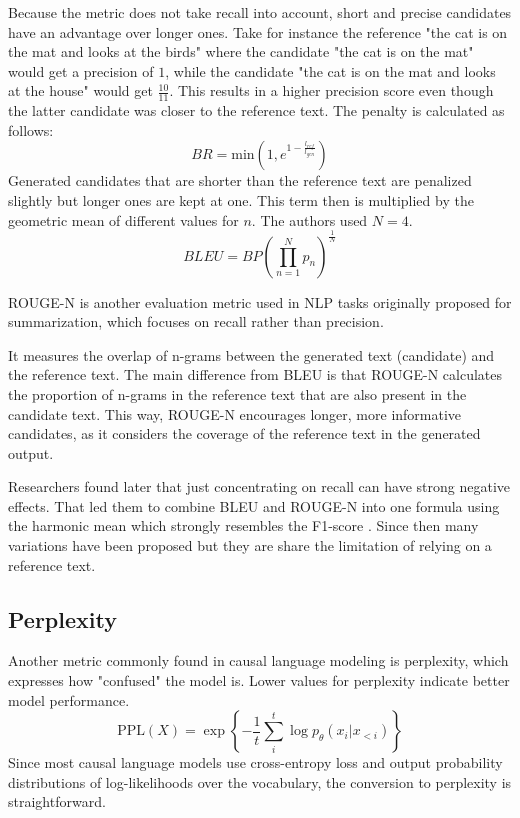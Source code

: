 Because the metric does not take recall into account, short and precise candidates have an advantage over longer ones. Take for instance the reference "the cat is on the mat and looks at the birds" where the candidate "the cat is on the mat" would get a precision of $1$, while the candidate "the cat is on the mat and looks at the house" would get $\frac{10}{11}$. This results in a higher precision score even though the latter candidate was closer to the reference text. The penalty is calculated as follows:
\begin{equation}
    BR = \text{min}(1, e^{1-\frac{l_{ref}}{l_{gen}}})
\end{equation}
Generated candidates that are shorter than the reference text are penalized slightly but longer ones are kept at one. This term then is multiplied by the geometric mean of different values for $n$. The authors used $N=4$.
\begin{equation}
    BLEU = BP \left(\prod_{n=1}^N p_n\right)^{\frac{1}{N}}
\end{equation}

ROUGE-N \cite{lin2004rouge} is another evaluation metric used in NLP tasks originally proposed for summarization, which focuses on recall rather than precision.

It measures the overlap of n-grams between the generated text (candidate) and the reference text. The main difference from BLEU is that ROUGE-N calculates the proportion of n-grams in the reference text that are also present in the candidate text. This way, ROUGE-N encourages longer, more informative candidates, as it considers the coverage of the reference text in the generated output.

Researchers found later that just concentrating on recall can have strong negative effects. That led them to combine BLEU and ROUGE-N into one formula using the harmonic mean which strongly resembles the F1-score \cite[p. 152]{tunstall2022transformers}. Since then many variations have been proposed but they are share the limitation of relying on a reference text.

\subsection{Perplexity} \label{sec:perplexity}
Another metric commonly found in causal language modeling is perplexity, which expresses how "confused" the model is. Lower values for perplexity indicate better model performance.
\begin{equation} \label{eq:ppl}
    \text{PPL}(X) = \exp \left\{ {-\frac{1}{t}\sum_i^t \log p_\theta (x_i|x_{<i}) } \right\}
\end{equation}
Since most causal language models use cross-entropy loss and output probability distributions of log-likelihoods over the vocabulary, the conversion to perplexity is straightforward.

